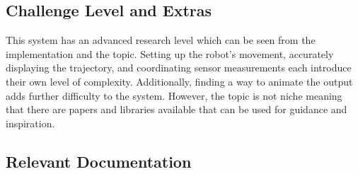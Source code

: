 \documentclass[12pt, titlepage]{article}
\begin{document}

\subsection{Challenge Level and Extras}

This system has an advanced research level which can be seen from the implementation and the topic. Setting up the robot’s movement, accurately displaying the trajectory, and coordinating sensor measurements each introduce their own level of complexity. Additionally, finding a way to animate the output adds further difficulty to the system. However, the topic is not niche meaning that there are papers and libraries available that can be used for guidance and inspiration.



\subsection{Relevant Documentation}

\end{document}
